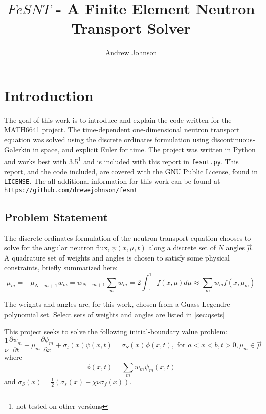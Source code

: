 \documentclass{article}
\title{$FeSNT$ - A Finite Element Neutron Transport Solver}
\author{Andrew Johnson}
\newcommand{\pdiff}[2]{\frac{\partial#1}{\partial#2}}
\newcommand{\ddx}[1]{\pdiff{#1}{x}}
\newcommand{\ddt}[1]{\pdiff{#1}{t}}
\newcommand{\dpmdx}{\ddx{\psi_m}}
\newcommand{\dpmdt}{\ddt{\psi_m}}
\newcommand{\fisTrms}{\chi\nu\sigma_f}
\newcommand{\tfor}{\text{ for }}
\begin{document}
\maketitle

\section{Introduction}
The goal of this work is to introduce and explain the code written for the MATH6641 project.
The time-dependent one-dimensional neutron transport equation was solved using the discrete 
ordinates formulation \cite{lewis1984computational} using discontinuous-Galerkin in space, and
explicit Euler for time.
The project was written in Python and works best with 3.5\footnote{not tested on other versions}
and is included with this report in \texttt{fesnt.py}.
This report, and the code included, are covered with the GNU Public License, found in \texttt{LICENSE}.
The all additional information for this work can be found at 
\texttt{https://github.com/drewejohnson/fesnt}
\subsection{Problem Statement}
The discrete-ordinates formulation of the neutron transport equation chooses to solve for the angular
neutron flux, $\psi(x, \mu, t)$ along a discrete set of $N$ angles $\vec{\mu}$. A quadrature set of 
weights and angles is chosen to satisfy some physical constraints, briefly summarized here:
\begin{subequations} 
    \label{eq:quadRules}
    \begin{equation}
        \mu_m = -\mu_{N-m+1}
    \end{equation}
    \begin{equation}
        w_m = w_{N-m+1}
    \end{equation}
    \begin{equation}
        \sum_m w_m = 2
    \end{equation}
    \begin{equation}
        \int_{-1}^1f(x, \mu)d\mu\approx\sum_mw_m f(x, \mu_m)
    \end{equation}
\end{subequations}

The weights and angles are, for this work, chosen from a Guass-Legendre polynomial set.
Select sets of weights and angles are listed in \cref{sec:qsets}

This project seeks to solve the following initial-boundary value problem:
\begin{equation} \label{eq:ibvpNTE}
    \frac{1}{\nu}\dpmdt+\mu_m\dpmdx+\sigma_t(x)\psi(x, t) = 
    \sigma_S(x)\phi(x, t), \tfor a<x<b,t>0, \mu_m\in\vec{\mu}
\end{equation}
where
\begin{equation}
    \phi(x, t) = \sum_mw_m\psi_m(x, t)
\end{equation}
and $\sigma_S(x) =\frac{1}{2}\left(\sigma_s(x) + \fisTrms(x)\right)$.
\end{document}

